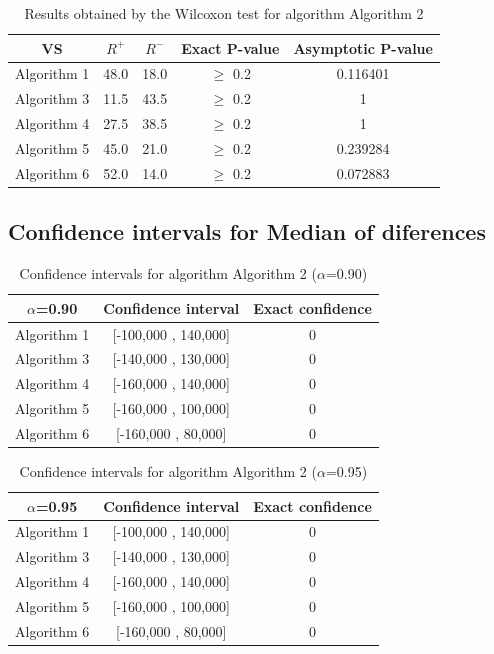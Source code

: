 \documentclass[a4paper,10pt]{article}
\begin{document}
\begin{table}[!htp]
\centering\small
\begin{tabular}{
|c|c|c|c|c|}
\hline
 VS & $R^{+}$ & $R^{-}$ & Exact P-value & Asymptotic P-value \\ \hline 
Algorithm 1 & 48.0 & 18.0 & $\geq$ 0.2 & 0.116401\\ \hline 
Algorithm 3 & 11.5 & 43.5 & $\geq$ 0.2 & 1\\ \hline 
Algorithm 4 & 27.5 & 38.5 & $\geq$ 0.2 & 1\\ \hline 
Algorithm 5 & 45.0 & 21.0 & $\geq$ 0.2 & 0.239284\\ \hline 
Algorithm 6 & 52.0 & 14.0 & $\geq$ 0.2 & 0.072883\\ \hline 

\end{tabular}
\caption{Results obtained by the Wilcoxon test for algorithm Algorithm 2}
\end{table}

\subsection{Confidence intervals for Median of diferences}

\begin{table}[!htp]
\centering\small
\begin{tabular}{
|c|c|c|}
\hline
 $\alpha$=0.90 & Confidence interval & Exact confidence \\ \hline 
Algorithm 1 & [-100,000 , 140,000] & 0\\ \hline 
Algorithm 3 & [-140,000 , 130,000] & 0\\ \hline 
Algorithm 4 & [-160,000 , 140,000] & 0\\ \hline 
Algorithm 5 & [-160,000 , 100,000] & 0\\ \hline 
Algorithm 6 & [-160,000 , 80,000] & 0\\ \hline 

\end{tabular}
\caption{Confidence intervals for algorithm Algorithm 2 ($\alpha$=0.90)}
\end{table}
\begin{table}[!htp]
\centering\small
\begin{tabular}{
|c|c|c|}
\hline
 $\alpha$=0.95 & Confidence interval & Exact confidence \\ \hline 
Algorithm 1 & [-100,000 , 140,000] & 0\\ \hline 
Algorithm 3 & [-140,000 , 130,000] & 0\\ \hline 
Algorithm 4 & [-160,000 , 140,000] & 0\\ \hline 
Algorithm 5 & [-160,000 , 100,000] & 0\\ \hline 
Algorithm 6 & [-160,000 , 80,000] & 0\\ \hline 

\end{tabular}
\caption{Confidence intervals for algorithm Algorithm 2 ($\alpha$=0.95)}
\end{table}
\end{document}
